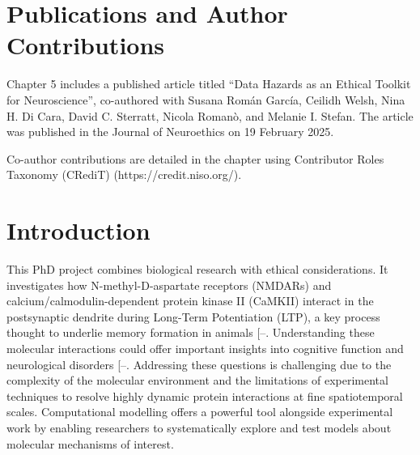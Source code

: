\documentclass[
  11pt,
  letterpaper,
]{scrreprt}
\begin{document}

\chapter*{Publications and Author
Contributions}\label{publications-and-author-contributions}


Chapter 5 includes a published article titled ``Data Hazards as an
Ethical Toolkit for Neuroscience'', co-authored with Susana Román
García, Ceilidh Welsh, Nina H. Di Cara, David C. Sterratt, Nicola
Romanò, and Melanie I. Stefan. The article was published in the Journal
of Neuroethics on 19 February 2025.

Co-author contributions are detailed in the chapter using Contributor
Roles Taxonomy (CRediT) (https://credit.niso.org/).


\chapter*{Introduction}\label{introduction}


This PhD project combines biological research with ethical
considerations. It investigates how N-methyl-D-aspartate receptors
(NMDARs) and calcium/calmodulin-dependent protein kinase II (CaMKII)
interact in the postsynaptic dendrite during Long-Term Potentiation
(LTP), a key process thought to underlie memory formation in animals
{[}--\citeproc{ref-park2024Fear}{4}{]}.
Understanding these molecular interactions could offer important
insights into cognitive function and neurological disorders
{[}--\citeproc{ref-yang2023NMDA}{8}{]}.
Addressing these questions is challenging due to the complexity of the
molecular environment and the limitations of experimental techniques to
resolve highly dynamic protein interactions at fine spatiotemporal
scales. Computational modelling offers a powerful tool alongside
experimental work by enabling researchers to systematically explore and
test models about molecular mechanisms of interest.
\end{document}
